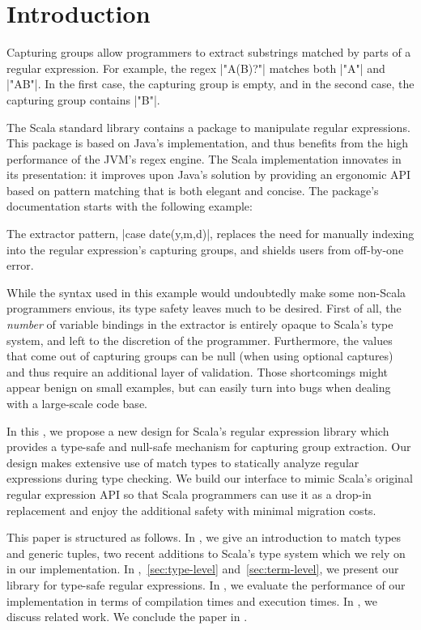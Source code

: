 \section{Introduction}

Capturing groups allow programmers to extract substrings matched by parts of a regular expression.
For example, the regex |"A(B)?"| matches both |"A"| and |"AB"|.
In the first case, the capturing group is empty, and in the second case, the capturing group contains |"B"|.

The Scala standard library contains a package to manipulate regular expressions.
This package is based on Java's implementation, and thus benefits from the high performance of the JVM's regex engine.
The Scala implementation innovates in its presentation: it improves upon Java's solution by providing an ergonomic API based on pattern matching that is both elegant and concise.
The package's documentation starts with the following example:

\regexDocumentation

\noindent
The extractor pattern, |case date(y,m,d)|, replaces the need for manually indexing into the regular expression's capturing groups, and shields users from off-by-one error.

While the syntax used in this example would undoubtedly make some non-Scala programmers envious, its type safety leaves much to be desired.
First of all, the \emph{number} of variable bindings in the extractor is entirely opaque to Scala's type system, and left to the discretion of the programmer.
Furthermore, the values that come out of capturing groups can be null (when using optional captures) and thus require an additional layer of validation.
Those shortcomings might appear benign on small examples, but can easily turn into bugs when dealing with a large-scale code base.

In this , we propose a new design for Scala's regular expression library which provides a type-safe and null-safe mechanism for capturing group extraction.
Our design makes extensive use of match types to statically analyze regular expressions during type checking.
We build our interface to mimic Scala's original regular expression API so that Scala programmers can use it as a drop-in replacement and enjoy the additional safety with minimal migration costs.

This paper is structured as follows.
In , we give an introduction to match types and generic tuples, two recent additions to Scala's type system which we rely on in our implementation.
In ,~\ref{sec:type-level} and~\ref{sec:term-level}, we present our library for type-safe regular expressions.
In , we evaluate the performance of our implementation in terms of compilation times and execution times.
In , we discuss related work.
We conclude the paper in .

